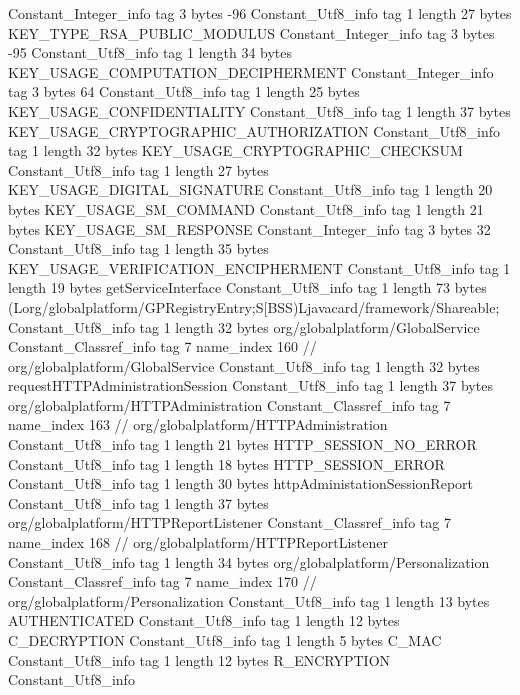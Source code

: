 {{{		}
		Constant_Integer_info {
			tag	3
			bytes	-96
		}
		Constant_Utf8_info {
			tag	1
			length	27
			bytes	KEY_TYPE_RSA_PUBLIC_MODULUS
		}
		Constant_Integer_info {
			tag	3
			bytes	-95
		}
		Constant_Utf8_info {
			tag	1
			length	34
			bytes	KEY_USAGE_COMPUTATION_DECIPHERMENT
		}
		Constant_Integer_info {
			tag	3
			bytes	64
		}
		Constant_Utf8_info {
			tag	1
			length	25
			bytes	KEY_USAGE_CONFIDENTIALITY
		}
		Constant_Utf8_info {
			tag	1
			length	37
			bytes	KEY_USAGE_CRYPTOGRAPHIC_AUTHORIZATION
		}
		Constant_Utf8_info {
			tag	1
			length	32
			bytes	KEY_USAGE_CRYPTOGRAPHIC_CHECKSUM
		}
		Constant_Utf8_info {
			tag	1
			length	27
			bytes	KEY_USAGE_DIGITAL_SIGNATURE
		}
		Constant_Utf8_info {
			tag	1
			length	20
			bytes	KEY_USAGE_SM_COMMAND
		}
		Constant_Utf8_info {
			tag	1
			length	21
			bytes	KEY_USAGE_SM_RESPONSE
		}
		Constant_Integer_info {
			tag	3
			bytes	32
		}
		Constant_Utf8_info {
			tag	1
			length	35
			bytes	KEY_USAGE_VERIFICATION_ENCIPHERMENT
		}
		Constant_Utf8_info {
			tag	1
			length	19
			bytes	getServiceInterface
		}
		Constant_Utf8_info {
			tag	1
			length	73
			bytes	(Lorg/globalplatform/GPRegistryEntry;S[BSS)Ljavacard/framework/Shareable;
		}
		Constant_Utf8_info {
			tag	1
			length	32
			bytes	org/globalplatform/GlobalService
		}
		Constant_Classref_info {
			tag	7
			name_index	160		// org/globalplatform/GlobalService
		}
		Constant_Utf8_info {
			tag	1
			length	32
			bytes	requestHTTPAdministrationSession
		}
		Constant_Utf8_info {
			tag	1
			length	37
			bytes	org/globalplatform/HTTPAdministration
		}
		Constant_Classref_info {
			tag	7
			name_index	163		// org/globalplatform/HTTPAdministration
		}
		Constant_Utf8_info {
			tag	1
			length	21
			bytes	HTTP_SESSION_NO_ERROR
		}
		Constant_Utf8_info {
			tag	1
			length	18
			bytes	HTTP_SESSION_ERROR
		}
		Constant_Utf8_info {
			tag	1
			length	30
			bytes	httpAdministationSessionReport
		}
		Constant_Utf8_info {
			tag	1
			length	37
			bytes	org/globalplatform/HTTPReportListener
		}
		Constant_Classref_info {
			tag	7
			name_index	168		// org/globalplatform/HTTPReportListener
		}
		Constant_Utf8_info {
			tag	1
			length	34
			bytes	org/globalplatform/Personalization
		}
		Constant_Classref_info {
			tag	7
			name_index	170		// org/globalplatform/Personalization
		}
		Constant_Utf8_info {
			tag	1
			length	13
			bytes	AUTHENTICATED
		}
		Constant_Utf8_info {
			tag	1
			length	12
			bytes	C_DECRYPTION
		}
		Constant_Utf8_info {
			tag	1
			length	5
			bytes	C_MAC
		}
		Constant_Utf8_info {
			tag	1
			length	12
			bytes	R_ENCRYPTION
		}
		Constant_Utf8_info {
}}}
